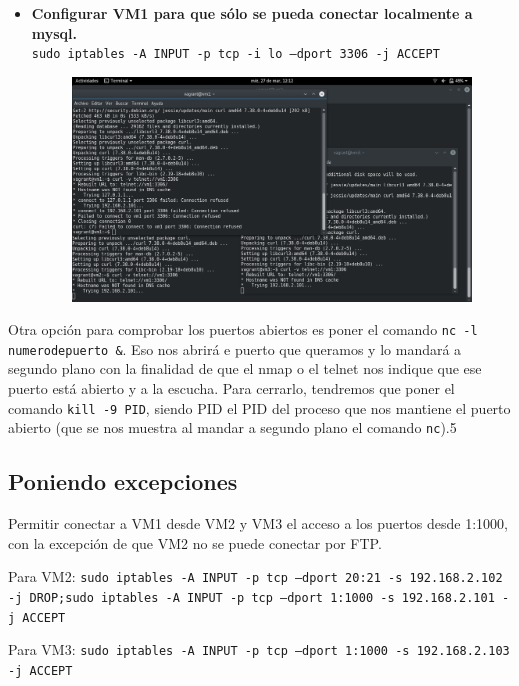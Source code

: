 \documentclass[12pt,letterpaper]{article}
\begin{document}
\begin{itemize}
\begin{figure}[h]
	\end{figure}
\newpage
	\item \textbf{Configurar VM1 para que sólo se pueda conectar localmente a mysql.} \\
	\texttt{sudo iptables -A INPUT -p tcp -i lo ---dport 3306 -j ACCEPT}
	\begin{figure}[h]
		\centering
		\includegraphics[scale=0.34]{mysql.png}
	\end{figure}
\end{itemize}

Otra opción para comprobar los puertos abiertos es poner el comando \texttt{nc -l numerodepuerto \&}. Eso nos abrirá e puerto que queramos y lo mandará a segundo plano con la finalidad de que el nmap o el telnet nos indique que ese puerto está abierto y a la escucha. Para cerrarlo, tendremos que poner el comando \texttt{kill -9 PID}, siendo PID el PID del proceso que nos mantiene el puerto abierto (que se nos muestra al mandar a segundo plano el comando \texttt{nc}).5

\newpage
\subsection{Poniendo excepciones}
Permitir conectar a VM1 desde VM2 y VM3 el acceso a los puertos desde 1:1000, con la excepción de que VM2 no se puede conectar por FTP.

Para VM2: \texttt{sudo iptables -A INPUT -p tcp ---dport 20:21 -s 192.168.2.102 -j DROP;sudo iptables -A INPUT -p tcp ---dport 1:1000 -s 192.168.2.101 -j ACCEPT}

Para VM3: \texttt{sudo iptables -A INPUT -p tcp ---dport 1:1000 -s 192.168.2.103 -j ACCEPT}
\end{document}
